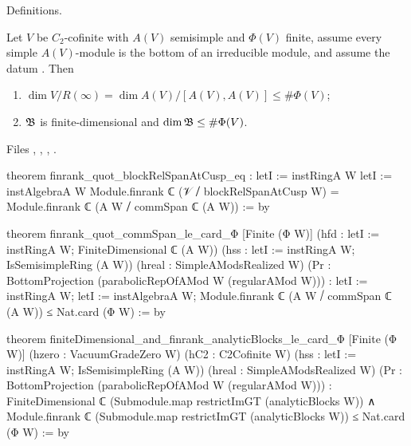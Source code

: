 \begin{status}
Definitions.
\end{status}

\begin{theorem}\label{l15:thm:533}
Let $V$ be $C_2$-cofinite with $A(V)$ semisimple and $\Phi(V)$ finite, assume every simple $A(V)$-module is the bottom of an
irreducible module, and assume the datum . Then
\begin{enumerate}
\item $\dim V/R(\infty)=\dim A(V)/[A(V),A(V)]\le\#\Phi(V)$;
\item $\mathfrak{B}$ is finite-dimensional and $\dim\mathfrak{B}\le\#\Phi(V)$.
\end{enumerate}
\end{theorem}
\noindent Files , ,
, .
\begin{leancode}
theorem finrank_quot_blockRelSpanAtCusp_eq :
    letI := instRingA W
    letI := instAlgebraA W
    Module.finrank ℂ (𝒱 ⧸ blockRelSpanAtCusp W)
      = Module.finrank ℂ (A W ⧸ commSpan ℂ (A W)) := by

theorem finrank_quot_commSpan_le_card_Φ [Finite (Φ W)]
    (hfd : letI := instRingA W; FiniteDimensional ℂ (A W))
    (hss : letI := instRingA W; IsSemisimpleRing (A W))
    (hreal : SimpleAModsRealized W)
    (Pr : BottomProjection (parabolicRepOfAMod W (regularAMod W))) :
    letI := instRingA W; letI := instAlgebraA W;
    Module.finrank ℂ (A W ⧸ commSpan ℂ (A W)) ≤ Nat.card (Φ W) := by

theorem finiteDimensional_and_finrank_analyticBlocks_le_card_Φ [Finite (Φ W)]
    (hzero : VacuumGradeZero W) (hC2 : C2Cofinite W)
    (hss : letI := instRingA W; IsSemisimpleRing (A W))
    (hreal : SimpleAModsRealized W)
    (Pr : BottomProjection (parabolicRepOfAMod W (regularAMod W))) :
    FiniteDimensional ℂ (Submodule.map restrictImGT (analyticBlocks W)) ∧
      Module.finrank ℂ (Submodule.map restrictImGT (analyticBlocks W)) ≤ Nat.card (Φ W) := by
\end{leancode}

